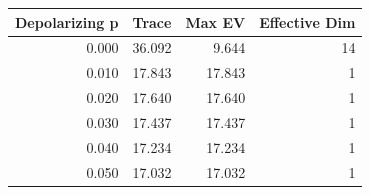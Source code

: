 \begin{tabular}{rrrr}
\toprule
Depolarizing p & Trace & Max EV & Effective Dim \\
\midrule
0.000 & 36.092 & 9.644 & 14 \\
0.010 & 17.843 & 17.843 & 1 \\
0.020 & 17.640 & 17.640 & 1 \\
0.030 & 17.437 & 17.437 & 1 \\
0.040 & 17.234 & 17.234 & 1 \\
0.050 & 17.032 & 17.032 & 1 \\
\bottomrule
\end{tabular}
